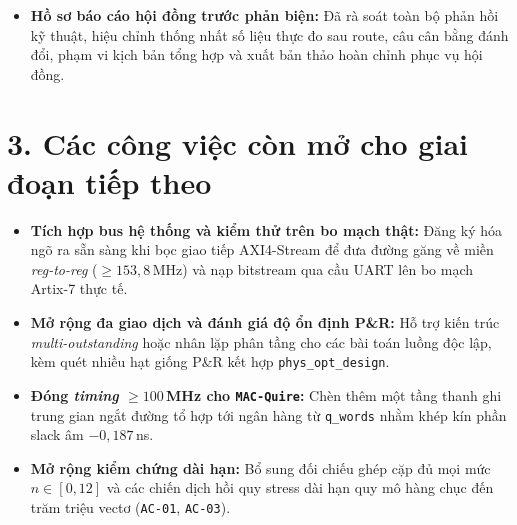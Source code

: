 \begin{itemize}
        $\ge 142{,}9$\,MHz (đóng tại $7{,}0$\,ns với $\mathrm{WNS}=+0{,}045$\,ns dưới
        ngân sách I/O $2{,}5/0{,}5$\,ns; ước lượng $10$\,ns là $129{,}0$\,MHz), cao
        hơn mức $\ge 135{,}1$\,MHz R2R / $100$\,MHz toàn thiết kế của \texttt{MAC-NF}
        và $98{,}16$\,MHz của \texttt{MAC-Quire}. Thông lượng trung bình đạt
        $8{,}53$\,M\,MAC/s với $P_{\mathrm{dyn}}=4$\,mW ($0{,}721$\,nJ/MAC tại
        $100$\,MHz, độ phân giải \textit{vectorless} $\pm 0{,}5$\,mW). Đối chiếu
        với \texttt{Xilinx FP32} ($180\text{--}195$\,MHz suy ra từ lượt $10$\,ns,
        $765\text{--}993$ LUT, $1.285\text{--}1.520$ FF, $21\text{--}25$\,mW):
        \texttt{MAC-F} tốn nhiều LUT hơn, năng lượng/MAC cao hơn $\approx 3\times$,
        SNR FIR thấp hơn ($72{,}5$ so với $138{,}9$\,dB) và thua trên luồng độc
        lập $II=1$, nhưng bù lại dùng $0$ DSP, giảm $48{,}6\%$ FF so với
        \texttt{0-DSP}, công suất động nhỏ hơn khoảng $5\text{--}7\times$ và đạt
        tốc độ gần ngang ngửa \texttt{FP32 0-DSP} trên một chuỗi phụ thuộc đơn lẻ
        ($8{,}53$ so với $8{,}88$\,M\,MAC/s).
  \item \textbf{Hồ sơ báo cáo hội đồng trước phản biện:} Đã rà soát toàn bộ phản
        hồi kỹ thuật, hiệu chỉnh thống nhất số liệu thực đo sau route, câu cân bằng
        đánh đổi, phạm vi kịch bản tổng hợp và xuất bản thảo hoàn chỉnh phục vụ hội đồng.
\end{itemize}

\section*{3. Các công việc còn mở cho giai đoạn tiếp theo}
\begin{itemize}
  \item \textbf{Tích hợp bus hệ thống và kiểm thử trên bo mạch thật:} Đăng ký hóa
        ngõ ra sẵn sàng khi bọc giao tiếp AXI4-Stream để đưa đường găng về miền
        \textit{reg-to-reg} ($\ge 153{,}8$\,MHz) và nạp bitstream qua cầu UART lên
        bo mạch Artix-7 thực tế.
  \item \textbf{Mở rộng đa giao dịch và đánh giá độ ổn định P\&R:} Hỗ trợ kiến
        trúc \textit{multi-outstanding} hoặc nhân lặp phân tầng cho các bài toán
        luồng độc lập, kèm quét nhiều hạt giống P\&R kết hợp \texttt{phys\_opt\_design}.
  \item \textbf{Đóng \textit{timing} $\ge 100$\,MHz cho \texttt{MAC-Quire}:} Chèn
        thêm một tầng thanh ghi trung gian ngắt đường tổ hợp tới ngân hàng từ
        \texttt{q\_words} nhằm khép kín phần slack âm $-0{,}187$\,ns.
  \item \textbf{Mở rộng kiểm chứng dài hạn:} Bổ sung đối chiếu ghép cặp đủ mọi
        mức $n \in [0, 12]$ và các chiến dịch hồi quy stress dài hạn quy mô hàng
        chục đến trăm triệu vectơ (\texttt{AC-01}, \texttt{AC-03}).
\end{itemize}


